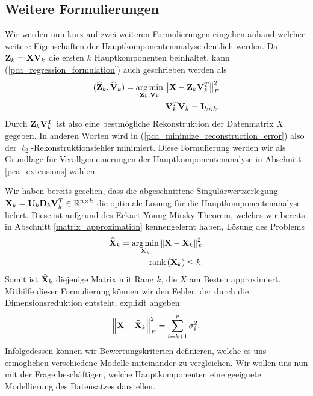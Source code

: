 \subsection{Weitere Formulierungen} 

Wir werden nun kurz auf zwei weiteren Formulierungen eingehen anhand welcher weitere Eigenschaften der Hauptkomponentenanalyse deutlich werden. Da $\mathbf{Z}_k = \mathbf{X} \mathbf{V}_k$ die ersten $k$ Hauptkomponenten beinhaltet, kann (\ref{pca_regression_formulation}) auch geschrieben werden als
\begin{align}
\label{pca_minimize_reconstruction_error}
\begin{split}
(\widehat{\mathbf{Z}}_k, \widehat{\mathbf{V}}_k) = \operatorname*{arg\,min}_{\mathbf{Z}_k, \mathbf{V}_k} \left\lVert \mathbf{X} - \mathbf{Z}_k \mathbf{V}_k^T \right\rVert_{F}^{2}\\
\mathbf{V}_k^T\mathbf{V}_k = \mathbf{I}_{k \times k}.
\end{split}
\end{align}
Durch $\mathbf{Z}_k \mathbf{V}_k^T$ ist also eine bestmögliche Rekonstruktion der Datenmatrix $X$ gegeben. In anderen Worten wird in (\ref{pca_minimize_reconstruction_error}) also der $\ell_2$-Rekonstruktionsfehler minimiert. Diese Formulierung werden wir als Grundlage für Verallgemeinerungen der Hauptkomponentenanalyse in Abschnitt \ref{pca_extensions} wählen.

Wir haben bereits gesehen, dass die abgeschnittene Singulärwertzerlegung $\mathbf{X}_k = \mathbf{U}_k \mathbf{D}_k \mathbf{V}_k^T \in \mathbb{R}^{n \times k}$ die optimale Lösung für die Hauptkomponentenanalyse liefert. Diese ist aufgrund des Eckart-Young-Mirsky-Theorem, welches wir bereits in Abschnitt \ref{matrix_approximation} kennengelernt haben, Lösung des Problems
\begin{align}
\label{pca_best_rank_approximation}
\begin{split}
\widehat{\mathbf{X}}_k = \operatorname*{arg\,min}_{\mathbf{X}_k} \left\lVert \mathbf{X} - \mathbf{X}_k \right\rVert_F^2\\
\text{rank} \left( \mathbf{X}_k \right) \leq k.
\end{split}
\end{align}
Somit ist $\widehat{\mathbf{X}}_k$ diejenige Matrix mit Rang $k$, die $X$ am Besten approximiert. Mithilfe dieser Formulierung können wir den Fehler, der durch die Dimensionsreduktion entsteht, explizit angeben:
\begin{align*}
\left\lVert \mathbf{X} - \widehat{\mathbf{X}}_k \right\rVert_F^2 = \sum_{i=k+1}^p \sigma_i^2.
\end{align*}
Infolgedessen können wir Bewertungskriterien definieren, welche es uns ermöglichen verschiedene Modelle miteinander zu vergleichen. Wir wollen uns nun mit der Frage beschäftigen, welche Hauptkomponenten eine geeignete Modellierung des Datensatzes darstellen.



